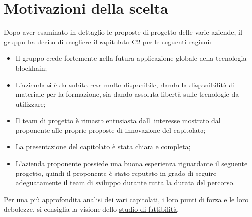 \section{Motivazioni della scelta}\label{section:motivazioni}

Dopo aver esaminato in dettaglio le proposte di progetto delle varie aziende,
 il gruppo ha deciso di scegliere il capitolato C2 per le seguenti ragioni:
\begin{itemize}
    \item Il gruppo crede fortemente nella futura applicazione globale della tecnologia blockhain;
    \item L'azienda si è da subito resa molto disponibile, dando la disponibilità di materiale per la formazione, sia dando assoluta libertà sulle tecnologie da utilizzare;
    \item Il team di progetto è rimasto entusiasta dall' interesse mostrato dal proponente alle proprie proposte di innovazione del capitolato;
    \item La presentazione del capitolato è stata chiara e completa;
    \item L'azienda proponente possiede una buona esperienza riguardante il seguente progetto, quindi il proponente è stato reputato in grado di seguire adeguatamente il team di sviluppo durante tutta la durata del percorso.
\end{itemize}

Per una più approfondita analisi dei vari capitolati,
 i loro punti di forza e le loro debolezze, si consiglia la visione dello \href{https://yakuzaishi-swe.github.io/docs/docs/studio_fattibilita.pdf}{studio di fattibilità}.